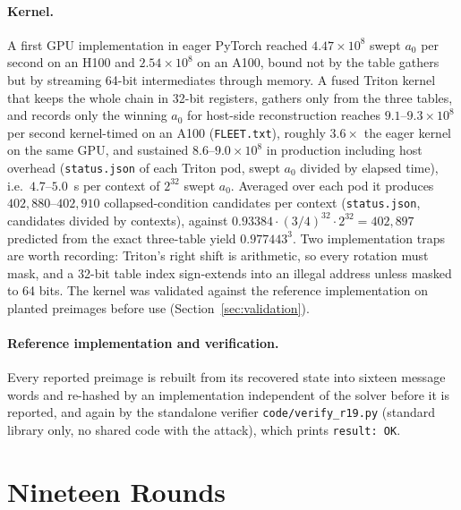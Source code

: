 \documentclass[11pt,a4paper]{article}
\begin{document}
\paragraph{Kernel.}
A first GPU implementation in eager PyTorch reached $4.47\times10^{8}$ swept
$a_0$ per second on an H100 and $2.54\times10^{8}$ on an A100, bound not by
the table gathers but by streaming 64-bit intermediates through memory.  A
fused Triton kernel that keeps the whole chain in 32-bit registers, gathers
only from the three tables, and records only the winning $a_0$ for host-side
reconstruction reaches $9.1$--$9.3\times10^{8}$ per second kernel-timed on an
A100 (\texttt{FLEET.txt}), roughly $3.6\times$ the eager kernel on the same
GPU, and sustained $8.6$--$9.0\times10^{8}$ in production including host
overhead (\texttt{status.json} of each Triton pod, swept $a_0$ divided by
elapsed time), i.e.\ $4.7$--$5.0$~s per context of $2^{32}$ swept $a_0$.  Averaged
over each pod it produces $402{,}880$--$402{,}910$ collapsed-condition
candidates per context (\texttt{status.json}, candidates divided by contexts),
against $0.93384\cdot(3/4)^{32}\cdot 2^{32}=402{,}897$ predicted from the
exact three-table yield $0.977443^3$.  Two
implementation traps are worth recording: Triton's right shift is arithmetic,
so every rotation must mask, and a 32-bit table index sign-extends into an
illegal address unless masked to 64 bits.  The kernel was validated against
the reference implementation on planted preimages before use
(Section~\ref{sec:validation}).

\paragraph{Reference implementation and verification.}
Every reported preimage is rebuilt from its recovered state into sixteen
message words and re-hashed by an implementation independent of the solver
before it is reported, and again by the standalone verifier
\texttt{code/verify\_r19.py} (standard library only, no shared code with the
attack), which prints \texttt{result: OK}.

\section{Nineteen Rounds}
\label{sec:r19}
\end{document}
